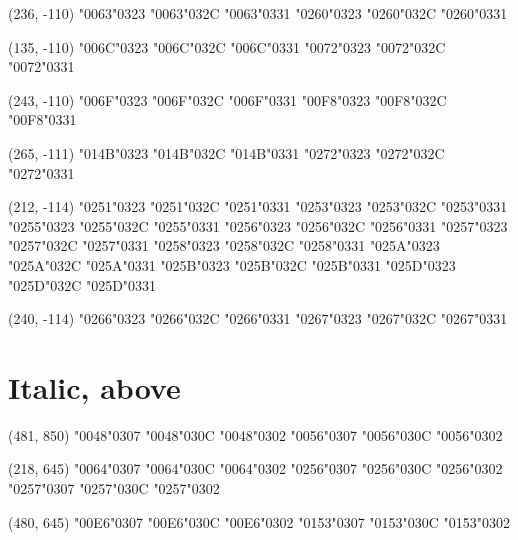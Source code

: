 (236, -110) \char"0063\cgj\char"0323 \char"0063\cgj\char"032C \char"0063\cgj\char"0331 \char"0260\cgj\char"0323 \char"0260\cgj\char"032C \char"0260\cgj\char"0331

(135, -110) \char"006C\cgj\char"0323 \char"006C\cgj\char"032C \char"006C\cgj\char"0331 \char"0072\cgj\char"0323 \char"0072\cgj\char"032C \char"0072\cgj\char"0331

(243, -110) \char"006F\cgj\char"0323 \char"006F\cgj\char"032C \char"006F\cgj\char"0331 \char"00F8\cgj\char"0323 \char"00F8\cgj\char"032C \char"00F8\cgj\char"0331

(265, -111) \char"014B\cgj\char"0323 \char"014B\cgj\char"032C \char"014B\cgj\char"0331 \char"0272\cgj\char"0323 \char"0272\cgj\char"032C \char"0272\cgj\char"0331

(212, -114) \char"0251\cgj\char"0323 \char"0251\cgj\char"032C \char"0251\cgj\char"0331 \char"0253\cgj\char"0323 \char"0253\cgj\char"032C \char"0253\cgj\char"0331 \char"0255\cgj\char"0323 \char"0255\cgj\char"032C \char"0255\cgj\char"0331 \char"0256\cgj\char"0323 \char"0256\cgj\char"032C \char"0256\cgj\char"0331 \char"0257\cgj\char"0323 \char"0257\cgj\char"032C \char"0257\cgj\char"0331 \char"0258\cgj\char"0323 \char"0258\cgj\char"032C \char"0258\cgj\char"0331 \char"025A\cgj\char"0323 \char"025A\cgj\char"032C \char"025A\cgj\char"0331 \char"025B\cgj\char"0323 \char"025B\cgj\char"032C \char"025B\cgj\char"0331 \char"025D\cgj\char"0323 \char"025D\cgj\char"032C \char"025D\cgj\char"0331

(240, -114) \char"0266\cgj\char"0323 \char"0266\cgj\char"032C \char"0266\cgj\char"0331 \char"0267\cgj\char"0323 \char"0267\cgj\char"032C \char"0267\cgj\char"0331


\section*{Italic, above}

(481, 850) \char"0048\cgj\char"0307 \char"0048\cgj\char"030C \char"0048\cgj\char"0302 \char"0056\cgj\char"0307 \char"0056\cgj\char"030C \char"0056\cgj\char"0302

(218, 645) \char"0064\cgj\char"0307 \char"0064\cgj\char"030C \char"0064\cgj\char"0302 \char"0256\cgj\char"0307 \char"0256\cgj\char"030C \char"0256\cgj\char"0302 \char"0257\cgj\char"0307 \char"0257\cgj\char"030C \char"0257\cgj\char"0302

(480, 645) \char"00E6\cgj\char"0307 \char"00E6\cgj\char"030C \char"00E6\cgj\char"0302 \char"0153\cgj\char"0307 \char"0153\cgj\char"030C \char"0153\cgj\char"0302


